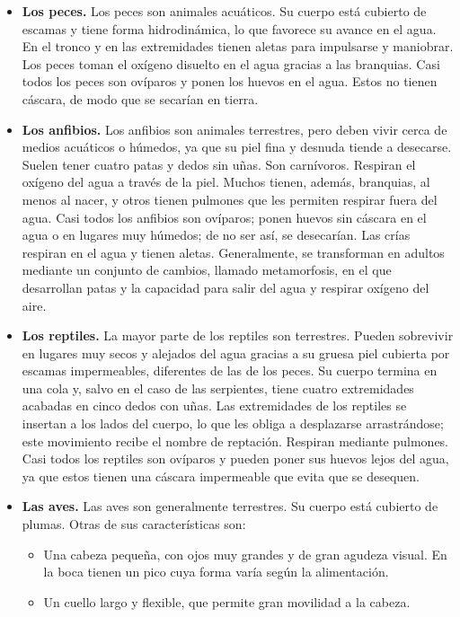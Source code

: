 \begin{itemize}
    \item \textbf{Los peces.} Los peces son animales acuáticos. Su cuerpo está cubierto de escamas y tiene forma hidrodinámica, lo que favorece su avance en el agua. En el tronco y en las extremidades tienen aletas para impulsarse y maniobrar. Los peces toman el oxígeno disuelto en el agua gracias a las branquias. Casi todos los peces son ovíparos y ponen los huevos en el agua. Estos no tienen cáscara, de modo que se secarían en tierra.
    \item \textbf{Los anfibios.} Los anfibios son animales terrestres, pero deben vivir cerca de medios acuáticos o húmedos, ya que su piel fina y desnuda tiende a desecarse. Suelen tener cuatro patas y dedos sin uñas. Son carnívoros. Respiran el oxígeno del agua a través de la piel. Muchos tienen, además, branquias, al menos al nacer, y otros tienen pulmones que les permiten respirar fuera del agua. Casi todos los anfibios son ovíparos; ponen huevos sin cáscara en el agua o en lugares muy húmedos; de no ser así, se desecarían. Las crías respiran en el agua y tienen aletas. Generalmente, se transforman en adultos mediante un conjunto de cambios, llamado metamorfosis, en el que desarrollan patas y la capacidad para salir del agua y respirar oxígeno del aire.
    \item \textbf{Los reptiles.} La mayor parte de los reptiles son terrestres. Pueden sobrevivir en lugares muy secos y alejados del agua gracias a su gruesa piel cubierta por escamas impermeables, diferentes de las de los peces. Su cuerpo termina en una cola y, salvo en el caso de las serpientes, tiene cuatro extremidades acabadas en cinco dedos con uñas. Las extremidades de los reptiles se insertan a los lados del cuerpo, lo que les obliga a desplazarse arrastrándose; este movimiento recibe el nombre de reptación. Respiran mediante pulmones. Casi todos los reptiles son ovíparos y pueden poner sus huevos lejos del agua, ya que estos tienen una cáscara impermeable que evita que se desequen.
    \item \textbf{Las aves.} Las aves son generalmente terrestres. Su cuerpo está cubierto de plumas. Otras de sus características son:
    \begin{itemize}
        \item Una cabeza pequeña, con ojos muy grandes y de gran agudeza visual. En la boca tienen un pico cuya forma varía según la alimentación.
        \item Un cuello largo y flexible, que permite gran movilidad a la cabeza.

\end{itemize}
\end{itemize}

